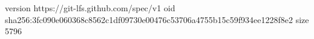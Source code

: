 version https://git-lfs.github.com/spec/v1
oid sha256:3fc090e060368c8562c1df09730e00476c53706a4755b15c59f934ee1228f8e2
size 5796
